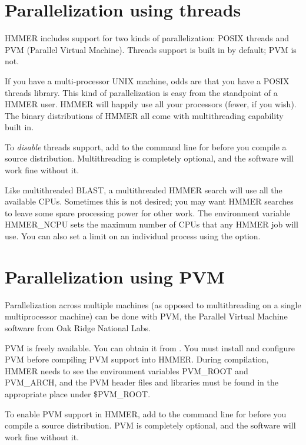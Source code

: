 \section{Parallelization using threads}

HMMER includes support for two kinds of parallelization: POSIX threads
and PVM (Parallel Virtual Machine). Threads support is built in by
default; PVM is not.

If you have a multi-processor UNIX machine, odds are that you have a
POSIX threads library. This kind of parallelization is easy from the
standpoint of a HMMER user. HMMER will happily use all your processors
(fewer, if you wish). The binary distributions of HMMER all come with
multithreading capability built in.

To {\em disable} threads support, add  to the
command line for  before you compile a source
distribution. Multithreading is completely optional, and the software
will work fine without it.

Like multithreaded BLAST, a multithreaded HMMER search will use all
the available CPUs. Sometimes this is not desired; you may want HMMER
searches to leave some spare processing power for other work.  The
environment variable HMMER\_NCPU sets the maximum number of CPUs that
any HMMER job will use. You can also set a limit on an individual
process using the  option.

\section{Parallelization using PVM}

Parallelization across multiple machines (as opposed to multithreading
on a single multiprocessor machine) can be done with PVM, the Parallel
Virtual Machine software from Oak Ridge National Labs.

PVM is freely available. You can obtain it from
. You must install and configure PVM before
compiling PVM support into HMMER. During compilation, HMMER needs to
see the environment variables PVM\_ROOT and PVM\_ARCH, and the PVM
header files and libraries must be found in the appropriate place
under \$PVM\_ROOT.

To enable PVM support in HMMER, add  to the command line
for  before you compile a source distribution.  PVM is
completely optional, and the software will work fine without it.

